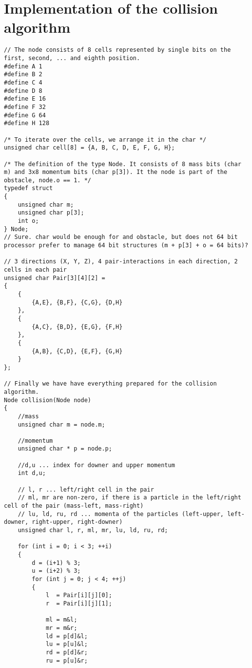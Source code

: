 \section{Implementation of the collision algorithm}
\begin{lstlisting}
// The node consists of 8 cells represented by single bits on the first, second, ... and eighth position.
#define A 1
#define B 2
#define C 4
#define D 8
#define E 16
#define F 32
#define G 64
#define H 128

/* To iterate over the cells, we arrange it in the char */
unsigned char cell[8] = {A, B, C, D, E, F, G, H};

/* The definition of the type Node. It consists of 8 mass bits (char m) and 3x8 momentum bits (char p[3]). It the node is part of the obstacle, node.o == 1. */
typedef struct
{
	unsigned char m;
	unsigned char p[3];
	int o;
} Node;
// Sure. char would be enough for and obstacle, but does not 64 bit processor prefer to manage 64 bit structures (m + p[3] + o = 64 bits)?

// 3 directions (X, Y, Z), 4 pair-interactions in each direction, 2 cells in each pair 
unsigned char Pair[3][4][2] = 
{
	{
		{A,E}, {B,F}, {C,G}, {D,H}
	},
	{
		{A,C}, {B,D}, {E,G}, {F,H}
	},
	{
		{A,B}, {C,D}, {E,F}, {G,H}
	}
};

// Finally we have have everything prepared for the collision algorithm.
Node collision(Node node)
{
	//mass
	unsigned char m = node.m;
	
	//momentum
    unsigned char * p = node.p;

	//d,u ... index for downer and upper momentum
	int d,u;
    
	// l, r ... left/right cell in the pair
	// ml, mr are non-zero, if there is a particle in the left/right cell of the pair (mass-left, mass-right)
	// lu, ld, ru, rd ... momenta of the particles (left-upper, left-downer, right-upper, right-downer)
	unsigned char l, r, ml, mr, lu, ld, ru, rd;

	for (int i = 0; i < 3; ++i)
	{
		d = (i+1) % 3;
		u = (i+2) % 3;
		for (int j = 0; j < 4; ++j)
		{		
			l  = Pair[i][j][0];
			r  = Pair[i][j][1];
			
			ml = m&l;
			mr = m&r;
			ld = p[d]&l;
			lu = p[u]&l;
			rd = p[d]&r;
			ru = p[u]&r;
			

\end{lstlisting}
